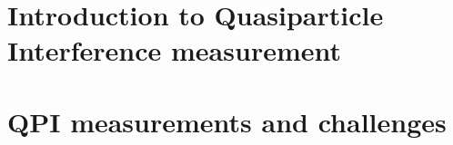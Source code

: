 \section{Introduction to Quasiparticle Interference measurement}

\section{QPI measurements and challenges}